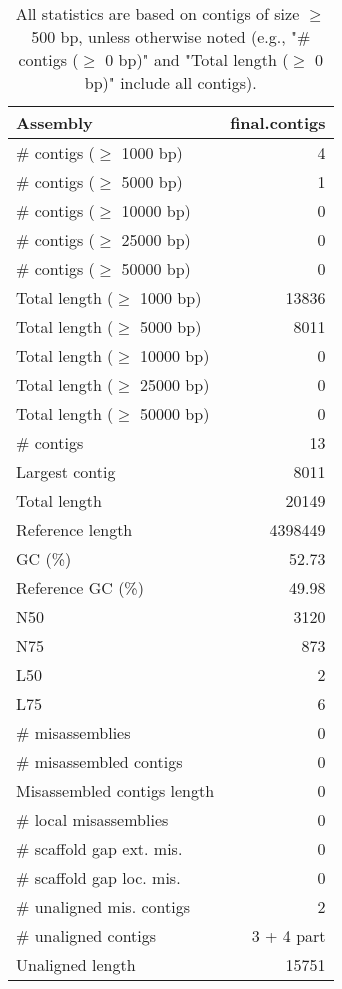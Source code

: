 \documentclass[12pt,a4paper]{article}
\begin{document}
\begin{table}[ht]
\begin{center}
\caption{All statistics are based on contigs of size $\geq$ 500 bp, unless otherwise noted (e.g., "\# contigs ($\geq$ 0 bp)" and "Total length ($\geq$ 0 bp)" include all contigs).}
\begin{tabular}{|l*{1}{|r}|}
\hline
Assembly & final.contigs \\ \hline
\# contigs ($\geq$ 1000 bp) & 4 \\ \hline
\# contigs ($\geq$ 5000 bp) & 1 \\ \hline
\# contigs ($\geq$ 10000 bp) & 0 \\ \hline
\# contigs ($\geq$ 25000 bp) & 0 \\ \hline
\# contigs ($\geq$ 50000 bp) & 0 \\ \hline
Total length ($\geq$ 1000 bp) & 13836 \\ \hline
Total length ($\geq$ 5000 bp) & 8011 \\ \hline
Total length ($\geq$ 10000 bp) & 0 \\ \hline
Total length ($\geq$ 25000 bp) & 0 \\ \hline
Total length ($\geq$ 50000 bp) & 0 \\ \hline
\# contigs & 13 \\ \hline
Largest contig & 8011 \\ \hline
Total length & 20149 \\ \hline
Reference length & 4398449 \\ \hline
GC (\%) & 52.73 \\ \hline
Reference GC (\%) & 49.98 \\ \hline
N50 & 3120 \\ \hline
N75 & 873 \\ \hline
L50 & 2 \\ \hline
L75 & 6 \\ \hline
\# misassemblies & 0 \\ \hline
\# misassembled contigs & 0 \\ \hline
Misassembled contigs length & 0 \\ \hline
\# local misassemblies & 0 \\ \hline
\# scaffold gap ext. mis. & 0 \\ \hline
\# scaffold gap loc. mis. & 0 \\ \hline
\# unaligned mis. contigs & 2 \\ \hline
\# unaligned contigs & 3 + 4 part \\ \hline
Unaligned length & 15751 \\ \hline

\end{tabular}
\end{center}
\end{table}
\end{document}
